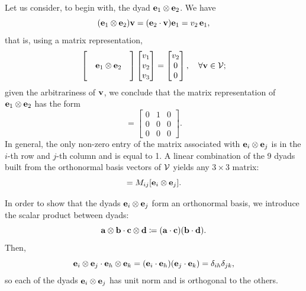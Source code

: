 Let us consider, to begin with, the dyad $\mathbf{e}_1\otimes \mathbf{e}_2$. We have
\begin{equation}
	(\mathbf{e}_1\otimes \mathbf{e}_2)\mathbf{v}=(\mathbf{e}_2\cdot \mathbf{v})\mathbf{e}_1=v_2\,\mathbf{e}_1,
\end{equation}
that is, using a matrix representation,
\begin{equation}
	\begin{bmatrix}&&\\&\mathbf{e}_{1}\otimes\mathbf{e}_{2}&\\&&\end{bmatrix}\begin{bmatrix}v_{1}\\v_{2}\\v_{3}\end{bmatrix}=\begin{bmatrix}v_{2}\\0\\0\end{bmatrix},\quad\forall\mathbf{v}\in \mathcal{V};
\end{equation}
given the arbitrariness of $\mathbf{v}$, we conclude that the matrix representation of $\mathbf{e}_{1}\otimes\mathbf{e}_2$ has the form
\begin{equation}
	[\eb_{1}\otimes\eb_2]=	\begin{bmatrix}0&1&0\\0&0&0\\0&0&0\end{bmatrix}.
\end{equation}
In general, the only non-zero entry of the matrix associated with $\mathbf{e}_i \otimes \mathbf{e}_j$ is in the $i$-th row and $j$-th column and is equal to 1. A linear combination of the 9 dyads built from the orthonormal basis vectors of $\mathcal{V}$ yields any $3\times 3$ matrix:
\begin{equation}
	[\mathbf{M}]=M_{ij}[\eb_i\otimes \eb_j].
\end{equation}

In order to show that the dyads $\mathbf{e}_i\otimes \mathbf{e}_j$ form an orthonormal basis, we introduce the scalar product between dyads:
\begin{equation}
	\mathbf{a} \otimes \mathbf{b} \cdot \mathbf{c} \otimes \mathbf{d} \coloneqq (\mathbf{a} \cdot \mathbf{c})(\mathbf{b}\cdot \mathbf{d}).
\end{equation}
Then,
\begin{equation}
	\mathbf{e}_i\otimes\mathbf{e}_j \cdot\mathbf{e}_h \otimes \mathbf{e}_k=(\mathbf{e}_i\cdot\mathbf{e}_h)(\mathbf{e}_j\cdot\mathbf{e}_k)=\delta_{ih}\delta_{jk},
\end{equation}
so each of the dyads $\mathbf{e}_i\otimes \mathbf{e}_j$ has unit norm and is orthogonal to the others.

